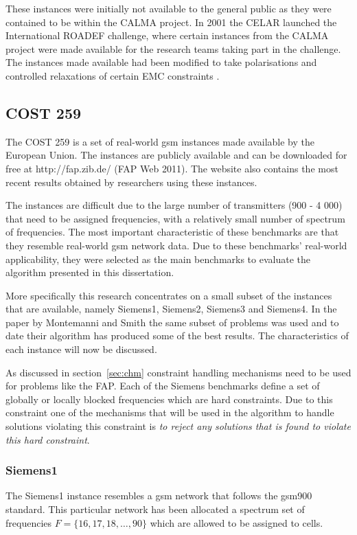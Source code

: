 These instances were initially not available to the general public as they were contained to be within the CALMA project\cite{CALMA}. In 2001 the CELAR launched the International ROADEF challenge, where certain instances from the CALMA project were made available for the research teams taking part in the challenge\cite{CALMA}. The instances made available had been modified to take polarisations and controlled relaxations of certain EMC constraints \cite{LowerPolarFAP}.
\subsection{COST 259}
\label{sec:COST259}
The \gls{COST} 259 is a set of real-world \gls{gsm} instances made available by the European Union. The instances are publicly available and can  be downloaded for free at http://fap.zib.de/ (FAP Web 2011). The website also contains the most recent results obtained by researchers using these instances\cite{Karen2004,Eisenblatter}.

The instances are difficult due to the large number of transmitters (900 - 4 000) that need to be assigned frequencies, with a relatively small number of spectrum of frequencies. The most important characteristic of these benchmarks are that they resemble real-world \gls{gsm} network data. Due to these benchmarks' real-world applicability, they were selected as the main benchmarks to evaluate the algorithm presented in this dissertation.

More specifically this research concentrates on a small subset of the instances that are available, namely Siemens1, Siemens2, Siemens3 and Siemens4. In the paper by Montemanni and Smith \cite{TabuMontemanniSmith} the same subset of problems was used and to date their algorithm has produced some of the best results. The characteristics of each instance will now be discussed.

As discussed in section~\ref{sec:chm} constraint handling mechanisms need to be used for problems like the \gls{FAP}. Each of the Siemens benchmarks define a set of globally or locally blocked frequencies which are hard constraints. Due to this constraint one of the mechanisms that will be used in the algorithm to handle solutions violating this constraint is \emph{to reject any solutions that is found to violate this hard constraint}.
\subsubsection{Siemens1}
The Siemens1 instance resembles a \gls{gsm} network that follows the \gls{gsm}900 standard. This particular network has been allocated a spectrum set of frequencies $F = \{16,17,18,\dots,90\}$ which are allowed to be assigned to cells. 

